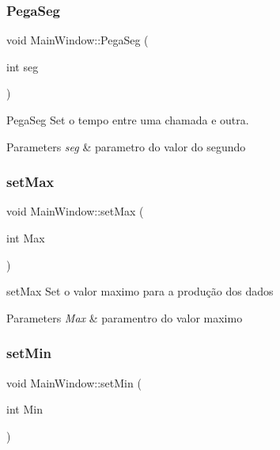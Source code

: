 \subsubsection{\texorpdfstring{Pega\+Seg}{PegaSeg}}
{\footnotesize\ttfamily void Main\+Window\+::\+Pega\+Seg (\begin{DoxyParamCaption}\item[{int}]{seg }\end{DoxyParamCaption})\hspace{0.3cm}{\ttfamily [slot]}}



Pega\+Seg Set o tempo entre uma chamada e outra. 


\begin{DoxyParams}{Parameters}
{\em seg} & parametro do valor do segundo \\
\hline
\end{DoxyParams}
\mbox{\label{class_main_window_abd23e6005d51e6a4426cfa39f88e0ba6}} 
\subsubsection{\texorpdfstring{set\+Max}{setMax}}
{\footnotesize\ttfamily void Main\+Window\+::set\+Max (\begin{DoxyParamCaption}\item[{int}]{Max }\end{DoxyParamCaption})\hspace{0.3cm}{\ttfamily [slot]}}



set\+Max Set o valor maximo para a produção dos dados 


\begin{DoxyParams}{Parameters}
{\em Max} & paramentro do valor maximo \\
\hline
\end{DoxyParams}
\mbox{\label{class_main_window_a911cc55fc2d492c44679834146faa77f}} 
\subsubsection{\texorpdfstring{set\+Min}{setMin}}
{\footnotesize\ttfamily void Main\+Window\+::set\+Min (\begin{DoxyParamCaption}\item[{int}]{Min }\end{DoxyParamCaption})\hspace{0.3cm}{\ttfamily [slot]}}



